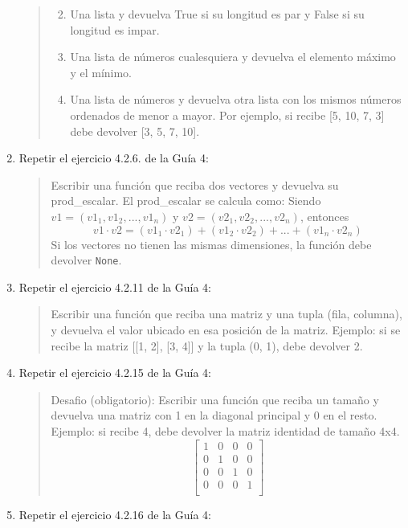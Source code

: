 \documentclass[
  letterpaper,
  DIV=11,
  numbers=noendperiod]{scrreprt}
\providecommand{\tightlist}{%
  \setlength{\itemsep}{0pt}\setlength{\parskip}{0pt}}\usepackage{longtable,booktabs,array}
\begin{document}
\begin{enumerate}
\begin{quote}
  \begin{enumerate}
  \def\labelenumii{\alph{enumii}.}
  \tightlist
  \item
    Una lista y devuelva True si su longitud es par y False si su
    longitud es impar.\\
  \item
    Una lista de números cualesquiera y devuelva el elemento máximo y el
    mínimo.\\
  \item
    Una lista de números y devuelva otra lista con los mismos números
    ordenados de menor a mayor. Por ejemplo, si recibe {[}5, 10, 7, 3{]}
    debe devolver {[}3, 5, 7, 10{]}.
  \end{enumerate}
  \end{quote}
\item
  Repetir el ejercicio 4.2.6. de la Guía 4:

  \begin{quote}
  Escribir una función que reciba dos vectores y devuelva su
  prod\_escalar. El prod\_escalar se calcula como: Siendo
  \(v1 = (v1_1, v1_2, ..., v1_n)\) y \(v2 = (v2_1, v2_2, ..., v2_n)\),
  entonces\\
  \[v1 \cdot v2 = (v1_1 \cdot v2_1) + (v1_2 \cdot v2_2) + ... + (v1_n \cdot v2_n)\]
  Si los vectores no tienen las mismas dimensiones, la función debe
  devolver \texttt{None}.
  \end{quote}
\item
  Repetir el ejercicio 4.2.11 de la Guía 4:

  \begin{quote}
  Escribir una función que reciba una matriz y una tupla (fila,
  columna), y devuelva el valor ubicado en esa posición de la matriz.
  Ejemplo: si se recibe la matriz {[}{[}1, 2{]}, {[}3, 4{]}{]} y la
  tupla (0, 1), debe devolver 2.
  \end{quote}
\item
  Repetir el ejercicio 4.2.15 de la Guía 4:

  \begin{quote}
  Desafio (obligatorio): Escribir una función que reciba un tamaño y
  devuelva una matriz con 1 en la diagonal principal y 0 en el resto.
  Ejemplo: si recibe 4, debe devolver la matriz identidad de tamaño
  4x4.\\
  \[
  \begin{bmatrix}
  1 & 0 & 0 & 0 \\
  0 & 1 & 0 & 0 \\
  0 & 0 & 1 & 0 \\
  0 & 0 & 0 & 1 \\
  \end{bmatrix}
  \]
  \end{quote}
\item
  Repetir el ejercicio 4.2.16 de la Guía 4:


\end{enumerate}
\end{document}
